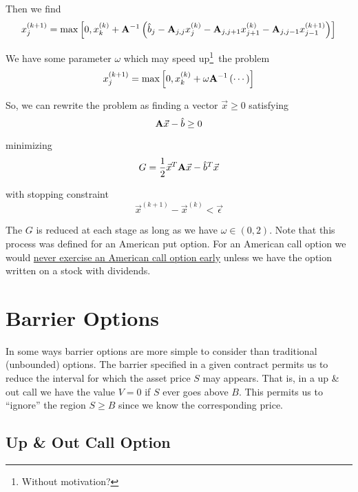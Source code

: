 \documentclass[12pt]{article}
\newlength\tindent
\renewcommand{\indent}{\hspace*{\tindent}}
\begin{document}
Then we find
\begin{equation*}
	x^{(k + 1)}_j = \max \left[0, x^{(k)}_k + {\bf A}^{-1} \left( \hat{b}_j - {\bf A}_{j,j}x^{(k)}_j - {\bf A}_{j,j+1}x^{(k)}_{j + 1} - {\bf A}_{j,j-1}x^{(k + 1)}_{j - 1} \right) \right]
\end{equation*}

We have some parameter $\omega$ which may speed up\footnote{Without motivation?}~the problem
\begin{equation*}
	x^{(k + 1)}_j = \max \left[0, x^{(k)}_k + \omega{\bf A}^{-1} \left( \cdots \right) \right]
\end{equation*}

So, we can rewrite the problem as finding a vector $\vec{x} \geq 0$ satisfying 
\begin{equation*}
	{\bf A}\vec{x} - \hat{b} \geq 0
\end{equation*}

minimizing
\begin{equation*}
	G = \frac{1}{2}\vec{x}^T {\bf A} \vec{x} - \hat{b}^T\vec{x}
\end{equation*}

with stopping constraint
\begin{equation*}
	\vec{x}^{(k + 1)} - \vec{x}^{(k)} < \vec{\epsilon}
\end{equation*}

The $G$ is reduced at each stage as long as we have $\omega \in (0, 2)$. Note that this process was defined for an American put option. For an American call option we would \underline{never exercise an American call option early} unless we have the option written on a stock with dividends.

\section{Barrier Options}

\indent In some ways barrier options are more simple to consider than traditional (unbounded) options. The barrier specified in a given contract permits us to reduce the interval for which the asset price $S$ may appears. That is, in a up \& out call we have the value $V = 0$ if $S$ ever goes above $B$. This permits us to ``ignore'' the region $S \geq B$ since we know the corresponding price.

\subsection{Up \& Out Call Option}
\end{document}
